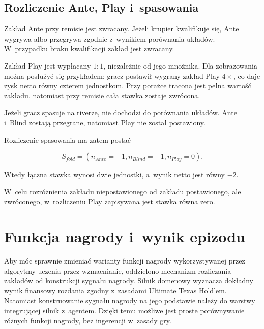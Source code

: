 \subsection{Rozliczenie Ante, Play i~spasowania}
\label{subsec:rozliczenie-ante-play}

Zakład Ante przy remisie jest zwracany.
Jeżeli krupier kwalifikuje się, Ante wygrywa albo przegrywa zgodnie
z~wynikiem porównania układów. W~przypadku braku kwalifikacji zakład jest zwracany.

Zakład Play jest wypłacany \(1{:}1\), niezależnie od jego mnożnika.
Dla zobrazowania można posłużyć się przykładem: gracz postawił
wygrany zakład Play \(4\times\), co daje zysk netto równy czterem
jednostkom. Przy porażce tracona jest pełna wartość zakładu, natomiast
przy remisie cała stawka zostaje zwrócona.

Jeżeli gracz spasuje na riverze, nie dochodzi do porównania układów. Ante i~Blind
zostają przegrane, natomiast Play nie został postawiony.

Rozliczenie spasowania ma zatem postać

\begin{equation}
    S_{fold}
    =
    \left(
        n_{Ante}=-1,
        n_{Blind}=-1,
        n_{Play}=0
    \right).
\end{equation}

Wtedy łączna stawka wynosi dwie jednostki, a~wynik netto jest równy \(-2\).

W~celu rozróżnienia zakładu niepostawionego od zakładu postawionego,
ale zwróconego, w~rozliczeniu Play zapisywana jest stawka równa zero.

\section{Funkcja nagrody i~wynik epizodu}
\label{sec:funkcja-nagrody}

Aby móc sprawnie zmieniać warianty funkcji nagrody wykorzystywanej przez algorytmy uczenia przez wzmacnianie,
oddzielono mechanizm rozliczania zakładów od konstrukcji sygnału nagrody.
Silnik domenowy
wyznacza dokładny wynik finansowy rozdania zgodny z~zasadami
Ultimate Texas Hold’em. Natomiast
konstruowanie sygnału nagrody na jego podstawie należy do warstwy
integrującej silnik z~agentem. Dzięki temu możliwe jest proste porównywanie różnych funkcji nagrody, bez
ingerencji w~zasady gry.
